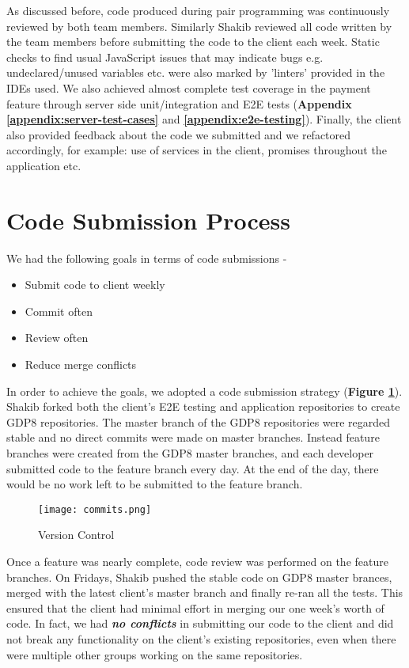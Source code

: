As discussed before, code produced during pair programming was continuously reviewed by both team members. Similarly Shakib reviewed all code written by the team members before submitting the code to the client each week. Static checks to find usual JavaScript issues that may indicate bugs e.g. undeclared/unused variables etc. were also marked by 'linters' provided in the IDEs used. We also achieved almost complete test coverage in the payment feature through server side unit/integration and E2E tests (\textbf{Appendix \ref{appendix:server-test-cases}} and \textbf{\ref{appendix:e2e-testing}}). Finally, the client also provided feedback about the code we submitted and we refactored accordingly, for example: use of services in the client, promises throughout the application etc.

\section{Code Submission Process}
\label{sec:code-submission-process}

We had the following goals in terms of code submissions -

\begin{itemize}

  \item Submit code to client weekly
  \item Commit often
  \item Review often
  \item Reduce merge conflicts

\end{itemize}

In order to achieve the goals, we adopted a code submission strategy (\textbf{Figure \ref{fig:version-control}}). Shakib forked both the client's E2E testing and application repositories to create GDP8 repositories. The master branch of the GDP8 repositories were regarded stable and no direct commits were made on master branches. Instead feature branches were created from the GDP8 master branches, and each developer submitted code to the feature branch every day. At the end of the day, there would be no work left to be submitted to the feature branch.\\

\begin{figure}[!hbt]
  	\centering
 	\texttt{[image: commits.png]}
  	\caption{Version Control}
 	\label{fig:version-control}
\end{figure}

Once a feature was nearly complete, code review was performed on the feature branches. On Fridays, Shakib pushed the stable code on GDP8 master brances, merged with the latest client's master branch and finally re-ran all the tests. This ensured that the client had minimal effort in merging our one week's worth of code. In fact, we had \textbf{\textit{no conflicts}} in submitting our code to the client and did not break any functionality on the client's existing repositories, even when there were multiple other groups working on the same repositories.
